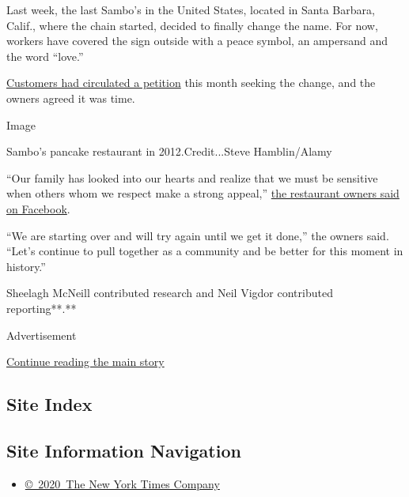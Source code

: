 Last week, the last Sambo's in the United States, located in Santa
Barbara, Calif., where the chain started, decided to finally change the
name. For now, workers have covered the sign outside with a peace
symbol, an ampersand and the word ``love.''

\href{https://www.change.org/p/sambos-is-a-racial-slur-help-me-change-the-name-of-the-restaurant}{Customers
had circulated a petition} this month seeking the change, and the owners
agreed it was time.

Image

Sambo's pancake restaurant in 2012.Credit...Steve Hamblin/Alamy

``Our family has looked into our hearts and realize that we must be
sensitive when others whom we respect make a strong appeal,''
\href{https://www.facebook.com/sambosrestaurant/?rf=102187006489323}{the
restaurant owners said on Facebook}.

``We are starting over and will try again until we get it done,'' the
owners said. ``Let's continue to pull together as a community and be
better for this moment in history.''

Sheelagh McNeill contributed research and Neil Vigdor contributed
reporting**.**

Advertisement

\protect\hyperlink{after-bottom}{Continue reading the main story}

\hypertarget{site-index}{%
\subsection{Site Index}\label{site-index}}

\hypertarget{site-information-navigation}{%
\subsection{Site Information
Navigation}\label{site-information-navigation}}

\begin{itemize}
\tightlist
\item
  \href{https://help.nytimes.com/hc/en-us/articles/115014792127-Copyright-notice}{©~2020~The
  New York Times Company}
\end{itemize}

